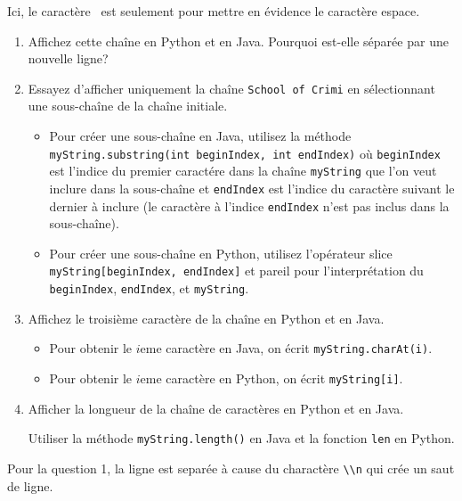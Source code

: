 \begin{Exercice}[10 minutes]
\begin{attention}
Ici, le caractère \textvisiblespace \ est seulement pour mettre en évidence le caractère espace. 
\end{attention}
\begin{enumerate}
\item Affichez cette chaîne en Python et en Java. Pourquoi est-elle séparée par une nouvelle ligne?
\item Essayez d'afficher uniquement la chaîne \texttt{School of Crimi} en sélectionnant une sous-chaîne de la chaîne initiale. 
\begin{conseil}
    \begin{itemize}
        \item Pour créer une sous-chaîne en Java, utilisez la méthode \texttt{myString.substring(int beginIndex, int endIndex)} où \texttt{beginIndex} est l'indice du premier caractére dans la chaîne \texttt{myString} que l'on veut inclure dans la sous-chaîne et \texttt{endIndex} est l'indice du caractère suivant le dernier à inclure (le caractère à l'indice \texttt{endIndex} n'est pas inclus dans la sous-chaîne).
        \item Pour créer une sous-chaîne en Python, utilisez l'opérateur slice \texttt{myString[beginIndex, endIndex]} et pareil pour l'interprétation du \texttt{beginIndex}, \texttt{endIndex}, et \texttt{myString}.
    \end{itemize}
\end{conseil}
\item Affichez le troisième caractère de la chaîne en Python et en Java. 
\begin{conseil}
    \begin{itemize}
        \item Pour obtenir le $i$eme caractère en Java, on écrit \texttt{myString.charAt(i)}.
    \item Pour obtenir le $i$eme caractère en Python, on écrit \texttt{myString[i]}.
    \end{itemize}
\end{conseil}
\item Afficher la longueur de la chaîne de caractères en Python et en Java.
\begin{conseil}
    Utiliser la méthode \texttt{myString.length()} en Java et la fonction \texttt{len} en Python.
\end{conseil}
\end{enumerate}
\begin{solution}
    Pour la question 1, la ligne est separée à cause du charactère \lstinline{\\n} qui crée un saut de ligne.
\end{solution}
\begin{solution}
   
\end{solution}
\begin{solution}
   
\end{solution}
\end{Exercice}


